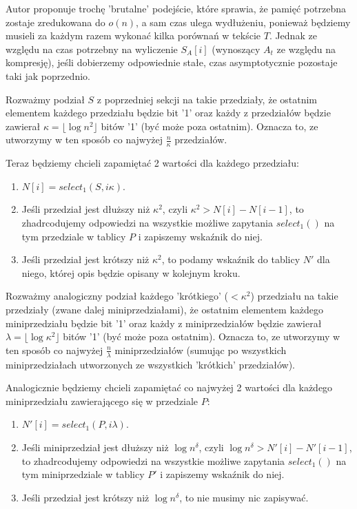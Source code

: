 \documentclass{article}
\begin{document}
Autor proponuje trochę 'brutalne' podejście, które sprawia, że pamięć potrzebna zostaje zredukowana do $o(n)$, a sam czas ulega wydłużeniu, ponieważ będziemy musieli za każdym razem wykonać kilka porównań w tekście $T$. Jednak ze względu na czas potrzebny na wyliczenie $S_A[i]$ (wynoszący $A_t$ ze względu na kompresję), jeśli dobierzemy odpowiednie stałe, czas asymptotycznie pozostaje taki jak poprzednio.

Rozważmy podział $S$ z poprzedniej sekcji na takie przedziały, że ostatnim elementem każdego przedziału będzie bit '1' oraz każdy z przedziałów będzie zawierał $\kappa = \lfloor \log{n}^2 \rfloor$ bitów '1' (być może poza ostatnim). Oznacza to, ze utworzymy w ten sposób co najwyżej $\frac{n}{\kappa}$ przedziałów.

Teraz będziemy chcieli zapamiętać 2 wartości dla każdego przedziału:
\begin{enumerate}
    \item $N[i] = select_1(S, i\kappa)$.
    \item Jeśli przedział jest dłuższy niż $\kappa^2$, czyli $\kappa^2 > N[i] - N[i-1]$, to zhadrcodujemy odpowiedzi na wszystkie możliwe zapytania $select_1()$ na tym przedziale w tablicy $P$ i zapiszemy wskaźnik do niej.
    \item Jeśli przedział jest krótszy niż $\kappa^2$, to podamy wskaźnik do tablicy $N'$ dla niego, której opis będzie opisany w kolejnym kroku.
\end{enumerate}

Rozważmy analogiczny podział każdego 'krótkiego' ($< \kappa^2$) przedziału na takie przedziały (zwane dalej miniprzedziałami), że ostatnim elementem każdego miniprzedziału będzie bit '1' oraz każdy z miniprzedziałów będzie zawierał $\lambda = \lfloor \log{\kappa}^2 \rfloor$ bitów '1' (być może poza ostatnim). Oznacza to, ze utworzymy w ten sposób co najwyżej $\frac{n}{\lambda}$ miniprzedziałów (sumując po wszystkich miniprzedziałach utworzonych ze wszystkich 'krótkich' przedziałów).

Analogicznie będziemy chcieli zapamiętać co najwyżej 2 wartości dla każdego miniprzedziału zawierającego się w przedziale $P$:
\begin{enumerate}
    \item $N'[i] = select_1(P, i\lambda)$.
    \item Jeśli miniprzedział jest dłuższy niż $\log{n}^{\delta}$, czyli $\log{n}^{\delta} > N'[i] - N'[i-1]$, to zhadrcodujemy odpowiedzi na wszystkie możliwe zapytania $select_1()$ na tym miniprzedziale w tablicy $P'$ i zapiszemy wskaźnik do niej.
    \item Jeśli przedział jest krótszy niż $\log{n}^{\delta}$, to nie musimy nic zapisywać.
\end{enumerate}
\end{document}

